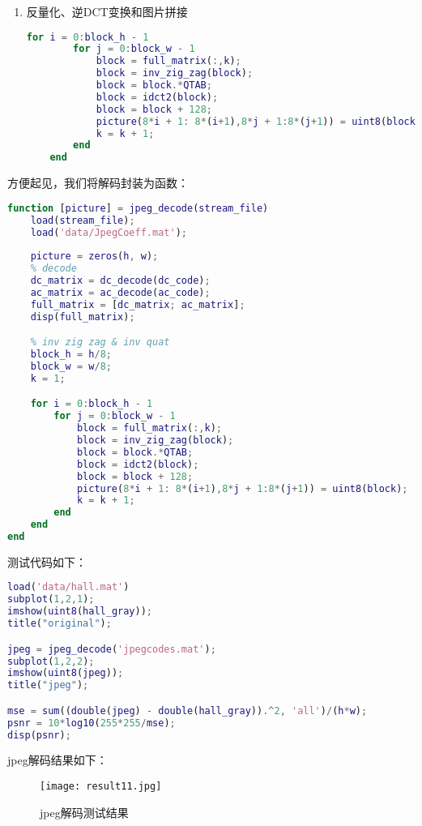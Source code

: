\documentclass[a4paper]{article}
\begin{document}
\begin{enumerate}
    \item 反量化、逆DCT变换和图片拼接
    \begin{lstlisting}[language=matlab, caption=反量化、逆DCT变换和图片拼接]
        for i = 0:block_h - 1
        for j = 0:block_w - 1
            block = full_matrix(:,k);
            block = inv_zig_zag(block);
            block = block.*QTAB;
            block = idct2(block);
            block = block + 128;
            picture(8*i + 1: 8*(i+1),8*j + 1:8*(j+1)) = uint8(block);
            k = k + 1;
        end
    end
    \end{lstlisting}
    
\end{enumerate}

\par 方便起见，我们将解码封装为函数：
\begin{lstlisting}[language=matlab, caption=jpeg-decode]
function [picture] = jpeg_decode(stream_file)
    load(stream_file);
    load('data/JpegCoeff.mat');
    
    picture = zeros(h, w);
    % decode
    dc_matrix = dc_decode(dc_code);
    ac_matrix = ac_decode(ac_code);
    full_matrix = [dc_matrix; ac_matrix];
    disp(full_matrix);

    % inv zig zag & inv quat
    block_h = h/8;
    block_w = w/8;
    k = 1;

    for i = 0:block_h - 1
        for j = 0:block_w - 1
            block = full_matrix(:,k);
            block = inv_zig_zag(block);
            block = block.*QTAB;
            block = idct2(block);
            block = block + 128;
            picture(8*i + 1: 8*(i+1),8*j + 1:8*(j+1)) = uint8(block);
            k = k + 1;
        end
    end
end
\end{lstlisting}

\par 测试代码如下：
\begin{lstlisting}[language=matlab, caption=jpeg测试]
load('data/hall.mat')
subplot(1,2,1);
imshow(uint8(hall_gray));
title("original");

jpeg = jpeg_decode('jpegcodes.mat');
subplot(1,2,2);
imshow(uint8(jpeg));
title("jpeg");

mse = sum((double(jpeg) - double(hall_gray)).^2, 'all')/(h*w);
psnr = 10*log10(255*255/mse);
disp(psnr);
\end{lstlisting}

\par jpeg解码结果如下：
    \begin{figure}[ht]
        \centering
        \texttt{[image: result11.jpg]}
        \caption{jpeg解码测试结果}
        \label{fig:result 11}
    \end{figure}
\end{document}
